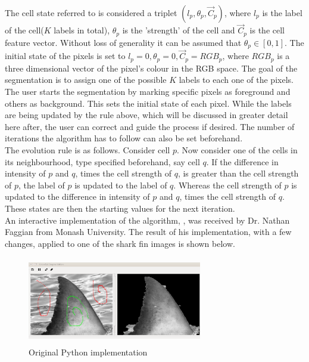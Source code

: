\documentclass[a4paper,10pt]{article}
\begin{document}
\noindent The cell state referred to is considered a triplet $(l_{p}, \theta_{p}, \overrightarrow{C}_{p})$, where $l_{p}$ is the label of the cell($K$ labels in total), $\theta_{p}$ is the 'strength' of the cell and $\overrightarrow{C}_{p}$ is the cell feature vector.  Without loss of generality it can be assumed that $\theta_{p} \in [0,1]$. 
The initial state of the pixels is set to $l_{p} = 0, \theta_{p} = 0, \overrightarrow{C}_{p} = RGB_{p}$, where $RGB_{p}$ is a three dimensional vector of the pixel's colour in 
the RGB space.  The goal of the segmentation is to assign one of the possible $K$ labels to each one of the pixels.  The user starts the segmentation by marking specific pixels as
foreground and others as background.  This sets the initial state of each pixel.  While the labels are being updated by the rule above, which will be discussed in greater detail here after, the user can correct and guide the process if desired.  The number of iterations the algorithm has to follow can also be set beforehand.  \\

\noindent The evolution rule is as follows.  Consider cell $p$.  Now consider one of the cells in its neighbourhood, type specified beforehand, say cell $q$.  If the difference in intensity of $p$ and $q$, times the cell strength of $q$, is greater than the cell strength of $p$, the label of $p$ is updated to the label of $q$.  Whereas the cell strength of $p$ is updated to the difference in intensity of $p$ and $q$, times the cell strength of $q$.  These states are then the starting values for the next iteration. \\

\noindent An interactive implementation of the algorithm, \cite{growcut}, was received by Dr. Nathan Faggian from Monash University.  The result of his implementation, with a few changes, applied to one of the shark fin images is shown below. 
\begin{figure}[H]
 \centering
 \includegraphics[width=3in, height=1.5in]{haaim}
 \caption{Original Python implementation}
 \label{fin}
\end{figure}    
\end{document}
